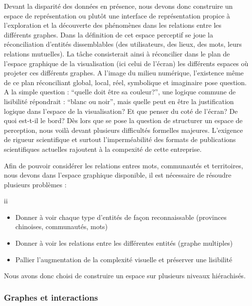 Devant la disparit\'e des donn\'ees en pr\'esence, nous devons donc
construire un espace de repr\'esentation ou plut\^ot une interface de
repr\'esentation propice \`a l{\textquoteright}exploration et la
d\'ecouverte des ph\'enom\`enes dans les relations entre les
diff\'erents graphes. Dans la d\'efinition de cet espace perceptif se
joue la r\'econciliation d{\textquoteright}entit\'es dissemblables (des
utilisateurs, des lieux, des mots, leurs relations mutuelles). La
t\^ache consisterait ainsi \`a r\'econcilier dans le plan de
l{\textquoteright}espace graphique de la visualisation (ici celui de
l{\textquoteright}\'ecran) les diff\'erents espaces o\`u projeter ces
diff\'erents graphes. A l{\textquoteright}image du milieu num\'erique,
l{\textquoteright}existence m\^eme de ce plan r\'econciliant global,
local, r\'eel, symbolique et imaginaire pose question. A la simple
question : {\textquotedblleft}quelle doit \^etre sa
couleur?{\textquotedblright}, une logique commune de lisibilit\'e
r\'epondrait : {\textquotedblleft}blanc ou noir{\textquotedblright},
mais quelle peut en \^etre la justification logique dans
l{\textquoteright}espace de la visualisation? Et que penser du cot\'e
de l{\textquoteright}\'ecran? De quoi est-t-il le bord? D\`es lors que
se pose la question de structurer un espace de perception, nous voil\`a
devant plusieurs difficult\'es formelles majeures.
L{\textquoteright}exigence de rigueur scientifique et surtout
l{\textquoteright}imperm\'eabilit\'e des formats de publications
scientifiques actuelles rajoutent \`a la compexit\'e de cette
entreprise.

Afin de pouvoir consid\'erer les relations entres mots, communaut\'es et
territoires, nous devons dans l{\textquoteright}espace graphique
disponible, il est n\'ecessaire de r\'esoudre plusieurs probl\`emes :

ii
\begin{itemize}
\item Donner \`a voir chaque type d{\textquoteright}entit\'es de
fa\c{c}on reconnaissable (provinces chinoises, communaut\'es, mots)
\item Donner \`a voir les relations entre les diff\'erentes entit\'es
(graphe multiples)
\item Pallier l{\textquoteright}augmentation de la complexit\'e visuelle
et pr\'eserver une lisibilit\'e
\end{itemize}
Nous avons donc choisi de construire un espace sur plusieurs niveaux
hi\'erachis\'es.

\subsubsection{Graphes et interactions}


